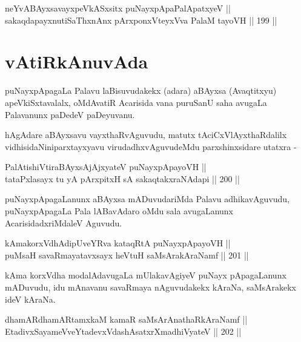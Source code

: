 \begin{shl}
neYvABAyxsavayxpeVkASx\s sitx puNayxpApaPalApatxyeV || \\
sakaqdapayxnutiSaThxnAnx pArxponxVteyxVva PalaM tayoVH ||  199 || 
\end{shl}

\section*{vAtiRkAnuvAda}

\begin{artha}
puNayxpApagaLa Palavu laBisuvudakekx (adara) aBAyxsa (Avaqtitxyu)
apeVkiSxtavalalx, oMdAvatiR Acarisida vana puruSanU saha avugaLa
Palavanunx paDedeV paDeyuvanu.
\end{artha}

\begin{artha}
hAgAdare aBAyxsavu vayxthaRvAguvudu, matutx tAciCxVlAyxthaRdalilx
vidhisidaNiniparxtayxyavu virudadhxvAguvudeMdu parxshinxsidare utatxra -
\end{artha}

\begin{shl}
PalAtishiVtiraBAyxsAjAjxyateV puNayxpApayoVH || \\
tataPxlasayx tu yA pArxpitxH sA sakaqtakxraNAdapi ||  200 ||  
\end{shl}

\begin{artha}
puNayxpApagaLanunx aBAyxsa mADuvudariMda Palavu adhikavAguvudu,
puNayxpApagaLa Pala lABavAdaro oMdu sala avugaLanunx
AcarisidadxriMdaleV Aguvudu.
\end{artha}


\begin{shl}
kAmakorxVdhAdipUveYRva kataqRtA puNayxpApayoVH || \\
puMsaH savaRmayatavxsayx heVtuH saMsArakAraNamf ||  201 ||  
\end{shl}

\begin{artha}
kAma korxVdha modalAdavugaLa mUlakavAgiyeV puNayx pApagaLanunx
mADuvudu, idu mAnavanu savaRmaya nAguvudakekx kAraNa, saMsArakekx ideV
kAraNa.
\end{artha}


\begin{shl}
dhamARdhamARtamxkaM kamaR saMsArAnathaRkAraNamf || \\
EtadivxSayameVveYtadevxVdashAsatxrXmadhiVyateV ||  202 ||  
\end{shl}


